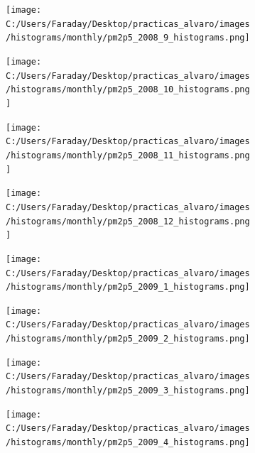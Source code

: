 \documentclass[12pt]{article}
\begin{document}
\begin{figure}[H]
\centering
\begin{subfigure}[h]{0.45\textwidth}
\texttt{[image: C:/Users/Faraday/Desktop/practicas\_alvaro/images/histograms/monthly/pm2p5\_2008\_9\_histograms.png]}
\caption{}
\label{fig:hist-mon-4-9-2008}
\end{subfigure}
%
\begin{subfigure}[H]{0.45\textwidth}
\texttt{[image: C:/Users/Faraday/Desktop/practicas\_alvaro/images/histograms/monthly/pm2p5\_2008\_10\_histograms.png]}
\caption{}
\label{fig:hist-mon-4-10-2008}
\end{subfigure}
\caption{}
\end{figure}

\begin{figure}[H]
\centering
\begin{subfigure}[h]{0.45\textwidth}
\texttt{[image: C:/Users/Faraday/Desktop/practicas\_alvaro/images/histograms/monthly/pm2p5\_2008\_11\_histograms.png]}
\caption{}
\label{fig:hist-mon-4-11-2008}
\end{subfigure}
%
\begin{subfigure}[H]{0.45\textwidth}
\texttt{[image: C:/Users/Faraday/Desktop/practicas\_alvaro/images/histograms/monthly/pm2p5\_2008\_12\_histograms.png]}
\caption{}
\label{fig:hist-mon-4-12-2008}
\end{subfigure}
\caption{}
\end{figure}

\newpage

\begin{figure}[H]
\centering
\begin{subfigure}[h]{0.45\textwidth}
\texttt{[image: C:/Users/Faraday/Desktop/practicas\_alvaro/images/histograms/monthly/pm2p5\_2009\_1\_histograms.png]}
\caption{}
\label{fig:hist-mon-4-1-2009}
\end{subfigure}
%
\begin{subfigure}[H]{0.45\textwidth}
\texttt{[image: C:/Users/Faraday/Desktop/practicas\_alvaro/images/histograms/monthly/pm2p5\_2009\_2\_histograms.png]}
\caption{}
\label{fig:hist-mon-4-2-2009}
\end{subfigure}
\caption{}
\end{figure}

\begin{figure}[H]
\centering
\begin{subfigure}[h]{0.45\textwidth}
\texttt{[image: C:/Users/Faraday/Desktop/practicas\_alvaro/images/histograms/monthly/pm2p5\_2009\_3\_histograms.png]}
\caption{}
\label{fig:hist-mon-4-3-2009}
\end{subfigure}
%
\begin{subfigure}[H]{0.45\textwidth}
\texttt{[image: C:/Users/Faraday/Desktop/practicas\_alvaro/images/histograms/monthly/pm2p5\_2009\_4\_histograms.png]}
\caption{}
\label{fig:hist-mon-4-4-2009}
\end{subfigure}
\caption{}
\end{figure}
\end{document}
